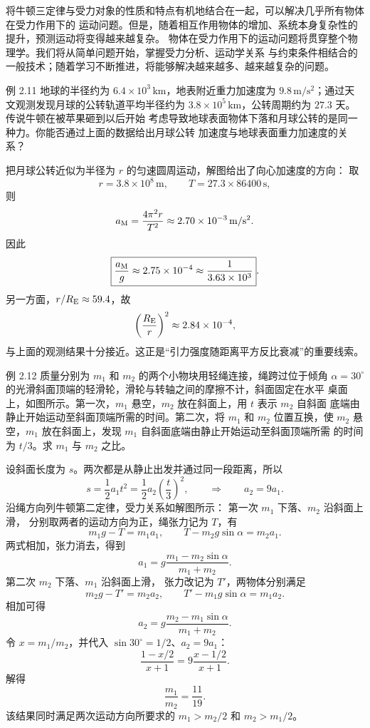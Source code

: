 将牛顿三定律与受力对象的性质和特点有机地结合在一起，可以解决几乎所有物体在受力作用下的
运动问题。但是，随着相互作用物体的增加、系统本身复杂性的提升，预测运动将变得越来越复杂。
物体在受力作用下的运动问题将贯穿整个物理学。我们将从简单问题开始，掌握受力分析、运动学关系
与约束条件相结合的一般技术；随着学习不断推进，将能够解决越来越多、越来越复杂的问题。



\begin{origexamplebox}{例 2.11}
地球的半径约为 $6.4\times10^3\,\mathrm{km}$，地表附近重力加速度为
$9.8\,\mathrm{m/s^2}$；通过天文观测发现月球的公转轨道平均半径约为
$3.8\times10^5\,\mathrm{km}$，公转周期约为 $27.3$ 天。传说牛顿在被苹果砸到以后开始
考虑导致地球表面物体下落和月球公转的是同一种力。你能否通过上面的数据给出月球公转
加速度与地球表面重力加速度的关系？
\end{origexamplebox}

\begin{xesolution}
把月球公转近似为半径为 $r$ 的匀速圆周运动，解图给出了向心加速度的方向：
\soldiagTwoEleven
取
\[
 r=3.8\times10^8\,\mathrm m,
 \qquad
 T=27.3\times86400\,\mathrm s,
\]
则
\[
 a_{\rm M}=\frac{4\pi^2r}{T^2}
 \approx2.70\times10^{-3}\,\mathrm{m/s^2}.
\]
因此
\[
 \boxed{\frac{a_{\rm M}}{g}\approx2.75\times10^{-4}
 \approx\frac1{3.63\times10^3}}.
\]
另一方面，$r/R_{\rm E}\approx59.4$，故
\[
 \left(\frac{R_{\rm E}}r\right)^2\approx2.84\times10^{-4},
\]
与上面的观测结果十分接近。这正是“引力强度随距离平方反比衰减”的重要线索。
\end{xesolution}

\begin{origexamplebox}{例 2.12}
质量分别为 $m_1$ 和 $m_2$ 的两个小物块用轻绳连接，绳跨过位于倾角
$\alpha=30^\circ$ 的光滑斜面顶端的轻滑轮，滑轮与转轴之间的摩擦不计，斜面固定在水平
桌面上，如图所示。第一次，$m_1$ 悬空，$m_2$ 放在斜面上，用 $t$ 表示 $m_2$ 自斜面
底端由静止开始运动至斜面顶端所需的时间。第二次，将 $m_1$ 和 $m_2$ 位置互换，使
$m_2$ 悬空，$m_1$ 放在斜面上，发现 $m_1$ 自斜面底端由静止开始运动至斜面顶端所需
的时间为 $t/3$。求 $m_1$ 与 $m_2$ 之比。
\probdiagTwoTwelve
\end{origexamplebox}

\begin{xesolution}
设斜面长度为 $s$。两次都是从静止出发并通过同一段距离，所以
\[
 s=\frac12a_1t^2
   =\frac12a_2\left(\frac t3\right)^2,
 \qquad\Rightarrow\qquad a_2=9a_1.
\]
沿绳方向列牛顿第二定律，受力关系如解图所示：
\soldiagTwoTwelve
第一次 $m_1$ 下落、$m_2$ 沿斜面上滑，
分别取两者的运动方向为正，绳张力记为 $T$，有
\[
 m_1g-T=m_1a_1,\qquad T-m_2g\sin\alpha=m_2a_1.
\]
两式相加，张力消去，得到
\[
 a_1=g\frac{m_1-m_2\sin\alpha}{m_1+m_2}.
\]
第二次 $m_2$ 下落、$m_1$ 沿斜面上滑，
张力改记为 $T'$，两物体分别满足
\[
 m_2g-T'=m_2a_2,\qquad T'-m_1g\sin\alpha=m_1a_2.
\]
相加可得
\[
 a_2=g\frac{m_2-m_1\sin\alpha}{m_1+m_2}.
\]
令 $x=m_1/m_2$，并代入 $\sin30^\circ=1/2$、$a_2=9a_1$：
\[
 \frac{1-x/2}{x+1}=9\frac{x-1/2}{x+1}.
\]
解得
\[
 \boxed{\frac{m_1}{m_2}=\frac{11}{19}}.
\]
该结果同时满足两次运动方向所要求的 $m_1>m_2/2$ 和 $m_2>m_1/2$。
\end{xesolution}

